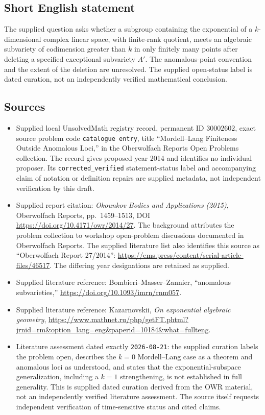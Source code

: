 \documentclass[11pt]{article}
\begin{document}
\subsection{Short English statement}
The supplied question asks whether a subgroup containing the exponential of a \(k\)-dimensional complex linear space, with finite-rank quotient, meets an algebraic subvariety of codimension greater than \(k\) in only finitely many points after deleting a specified exceptional subvariety \(A'\). The anomalous-point convention and the extent of the deletion are unresolved. The supplied open-status label is dated curation, not an independently verified mathematical conclusion.
\subsection{Sources}
\begin{itemize}
\item Supplied local UnsolvedMath registry record, permanent ID \(30002602\), exact source problem code \texttt{catalogue entry}, title ``Mordell--Lang Finiteness Outside Anomalous Loci,'' in the Oberwolfach Reports Open Problems collection. The record gives proposed year 2014 and identifies no individual proposer. Its \texttt{corrected\_verified} statement-status label and accompanying claim of notation or definition repairs are supplied metadata, not independent verification by this draft.
\item Supplied report citation: \emph{Okounkov Bodies and Applications (2015)}, Oberwolfach Reports, pp.~1459--1513, DOI \url{https://doi.org/10.4171/owr/2014/27}. The background attributes the problem collection to workshop open-problem discussions documented in Oberwolfach Reports. The supplied literature list also identifies this source as ``Oberwolfach Report 27/2014'': \url{https://ems.press/content/serial-article-files/46517}. The differing year designations are retained as supplied.
\item Supplied literature reference: Bombieri--Masser--Zannier, ``anomalous subvarieties,'' \url{https://doi.org/10.1093/imrn/rnm057}.
\item Supplied literature reference: Kazarnovskii, \emph{On exponential algebraic geometry}, \url{https://www.mathnet.ru/php/getFT.phtml?jrnid=rm&option_lang=eng&paperid=10184&what=fullteng}.
\item Literature assessment dated exactly \texttt{2026-08-21}: the supplied curation labels the problem open, describes the \(k=0\) Mordell--Lang case as a theorem and anomalous loci as understood, and states that the exponential-subspace generalization, including a \(k=1\) strengthening, is not established in full generality. This is supplied dated curation derived from the OWR material, not an independently verified literature assessment. The source itself requests independent verification of time-sensitive status and cited claims.
\end{itemize}
\end{document}

